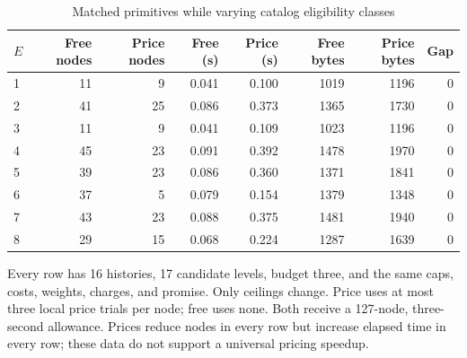 \begin{table}[p]
\centering\small
\setlength{\tabcolsep}{3.5pt}
\caption{Matched primitives while varying catalog eligibility classes}\label{tab:r51-matched}
\begin{tabular}{lrrrrrrr}
\toprule
$E$ & Free nodes & Price nodes & Free (s) & Price (s) & Free bytes & Price bytes & Gap \\
\midrule
1 & 11 & 9 & 0.041 & 0.100 & 1019 & 1196 & 0 \\
2 & 41 & 25 & 0.086 & 0.373 & 1365 & 1730 & 0 \\
3 & 11 & 9 & 0.041 & 0.109 & 1023 & 1196 & 0 \\
4 & 45 & 23 & 0.091 & 0.392 & 1478 & 1970 & 0 \\
5 & 39 & 23 & 0.086 & 0.360 & 1371 & 1841 & 0 \\
6 & 37 & 5 & 0.079 & 0.154 & 1379 & 1348 & 0 \\
7 & 43 & 23 & 0.088 & 0.375 & 1481 & 1940 & 0 \\
8 & 29 & 15 & 0.068 & 0.224 & 1287 & 1639 & 0 \\
\bottomrule
\end{tabular}
\par\smallskip\begin{minipage}{\textwidth}\footnotesize Every row has 16 histories, 17 candidate levels, budget three, and the same caps, costs, weights, charges, and promise. Only ceilings change. Price uses at most three local price trials per node; free uses none. Both receive a 127-node, three-second allowance. Prices reduce nodes in every row but increase elapsed time in every row; these data do not support a universal pricing speedup.\end{minipage}
\end{table}

